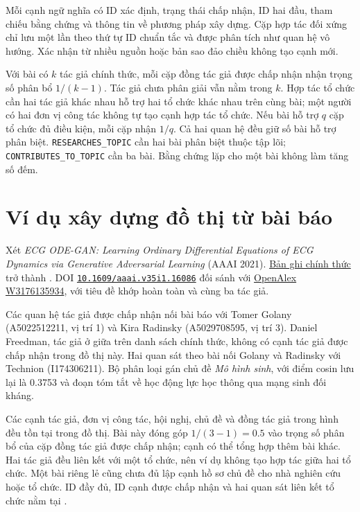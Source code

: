 
\FloatBarrier

Mỗi cạnh ngữ nghĩa có ID xác định, trạng thái chấp nhận, ID hai đầu, tham chiếu
bằng chứng và thông tin về phương pháp xây dựng. Cặp hợp tác đối xứng chỉ lưu một lần
theo thứ tự ID chuẩn tắc và được phân tích như quan hệ vô hướng. Xác nhận từ
nhiều nguồn hoặc bản sao đảo chiều không tạo cạnh mới.

Với bài có $k$ tác giả chính thức, mỗi cặp đồng tác giả được chấp nhận nhận
trọng số phân bổ $1/(k-1)$. Tác giả chưa phân giải vẫn nằm trong $k$. Hợp tác
tổ chức cần hai tác giả khác nhau hỗ trợ hai tổ chức khác nhau trên cùng bài;
một người có hai đơn vị công tác không tự tạo cạnh hợp tác tổ chức. Nếu bài
hỗ trợ $q$ cặp tổ chức đủ điều kiện, mỗi cặp nhận $1/q$. Cả hai quan hệ đều giữ
số bài hỗ trợ phân biệt. \texttt{RESEARCHES\_TOPIC} cần hai bài phân biệt thuộc
tập lõi; \texttt{CONTRIBUTES\_TO\_TOPIC} cần ba bài. Bằng chứng lặp cho một bài
không làm tăng số đếm.

\Needspace{18cm}
\section{Ví dụ xây dựng đồ thị từ bài báo}
Xét \emph{ECG ODE-GAN: Learning Ordinary Differential Equations of ECG Dynamics
via Generative Adversarial Learning} (AAAI 2021).
\href{https://ojs.aaai.org/index.php/AAAI/article/view/16086}{Bản ghi chính thức}
trở thành . DOI
\href{https://doi.org/10.1609/aaai.v35i1.16086}{\texttt{10.1609/aaai.v35i1.16086}}
đối sánh với \href{https://openalex.org/W3176135934}{OpenAlex W3176135934}, với
tiêu đề khớp hoàn toàn và cùng ba tác giả.

Các quan hệ tác giả được chấp nhận nối bài báo với Tomer Golany (A5022512211, vị trí 1) và Kira Radinsky
(A5029708595, vị trí 3). Daniel Freedman, tác giả ở giữa trên danh sách chính
thức, không có cạnh tác giả được chấp nhận trong đồ thị này. Hai quan sát theo
bài nối Golany và Radinsky với Technion (I174306211). Bộ phân loại gán chủ đề
\emph{Mô hình sinh}, với điểm cosin lưu lại là 0.3753 và đoạn tóm tắt về học
động lực học thông qua mạng sinh đối kháng.


\FloatBarrier

Các cạnh tác giả, đơn vị công tác, hội nghị, chủ đề và đồng tác giả trong hình
đều tồn tại trong đồ thị. Bài này đóng góp $1/(3-1)=0.5$ vào trọng số phân bổ của cặp
đồng tác giả được chấp nhận; cạnh có thể tổng hợp thêm bài khác. Hai tác giả
đều liên kết với một tổ chức, nên ví dụ không tạo hợp tác giữa hai tổ chức.
Một bài riêng lẻ cũng chưa đủ lập cạnh hồ sơ chủ đề cho nhà nghiên cứu hoặc tổ
chức. ID đầy đủ, ID cạnh được chấp nhận và hai quan sát liên kết tổ chức nằm tại
.
